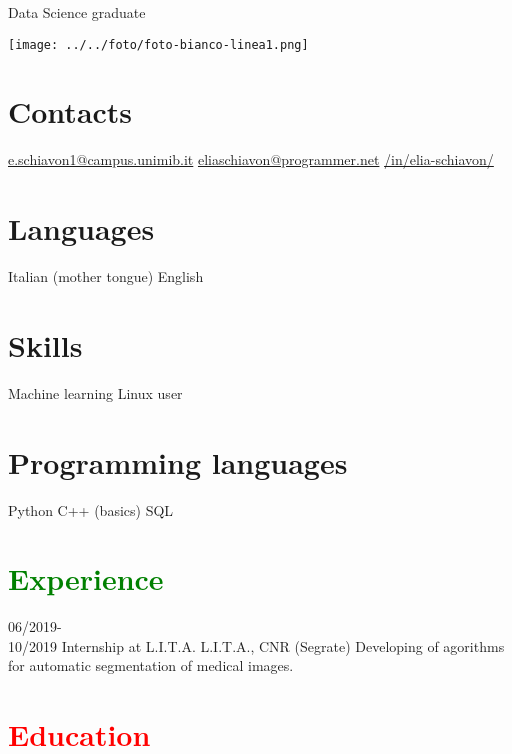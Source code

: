 \documentclass[a4paper]{friggeri-cv}
\begin{document}
       {Data Science graduate}



\begin{aside}
	{\texttt{[image: ../../foto/foto-bianco-linea1.png]}}
  \section{Contacts}
    {\color{gray}{\FA \faEnvelope}} \href{mailto:e.schiavon1@campus.unimib.it}{e.schiavon1@campus.unimib.it}
    {\color{gray}{\FA \faEnvelope}} \href{mailto:eliaschiavon@programmer.net}{eliaschiavon@programmer.net}
    {\color{cyan}{\FA \faLinkedinSquare}} \href{https://www.linkedin.com/in/elia-schiavon/}{/in/elia-schiavon/}
  \section{Languages}
    Italian (mother tongue)
    English
  \section{Skills}
    Machine learning
    Linux user
  \section{Programming languages}
	Python
	C++ (basics)
	SQL
\end{aside}

\section{\textcolor{green}{Experience}}

\begin{entrylist}
	\entry
	{06/2019-\\10/2019}
	{Internship at L.I.T.A.}
	{L.I.T.A., CNR (Segrate)}
	{Developing of agorithms for automatic segmentation of medical images.}
\end{entrylist}

\section{\textcolor{red}{Education}}
\end{document}
